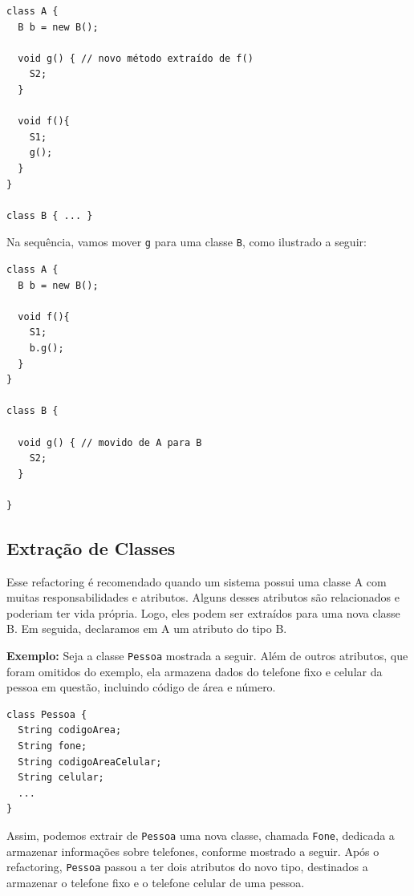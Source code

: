 \documentclass[
  11pt,
  twoside]{book}
\newcommand{\passthrough}[1]{#1}
\begin{document}
\begin{lstlisting}
class A {
  B b = new B();

  void g() { // novo método extraído de f()
    S2;
  }

  void f(){
    S1;
    g();
  }
}

class B { ... }
\end{lstlisting}

Na sequência, vamos mover \passthrough{\lstinline!g!} para uma classe
\passthrough{\lstinline!B!}, como ilustrado a seguir:

\begin{lstlisting}
class A {
  B b = new B();

  void f(){
    S1;
    b.g();
  }
}

class B {

  void g() { // movido de A para B
    S2;
  }

}
\end{lstlisting}

\hypertarget{extrauxe7uxe3o-de-classes}{%
\subsection{Extração de Classes}\label{extrauxe7uxe3o-de-classes}}


Esse refactoring é recomendado quando um sistema possui uma classe A com
muitas responsabilidades e atributos. Alguns desses atributos são
relacionados e poderiam ter vida própria. Logo, eles podem ser extraídos
para uma nova classe B. Em seguida, declaramos em A um atributo do tipo
B.

\textbf{Exemplo:} Seja a classe \passthrough{\lstinline!Pessoa!}
mostrada a seguir. Além de outros atributos, que foram omitidos do
exemplo, ela armazena dados do telefone fixo e celular da pessoa em
questão, incluindo código de área e número.

\begin{lstlisting}
class Pessoa {
  String codigoArea;
  String fone;
  String codigoAreaCelular;
  String celular;
  ...
}
\end{lstlisting}

Assim, podemos extrair de \passthrough{\lstinline!Pessoa!} uma nova
classe, chamada \passthrough{\lstinline!Fone!}, dedicada a armazenar
informações sobre telefones, conforme mostrado a seguir. Após o
refactoring, \passthrough{\lstinline!Pessoa!} passou a ter dois
atributos do novo tipo, destinados a armazenar o telefone fixo e o
telefone celular de uma pessoa.
\end{document}
